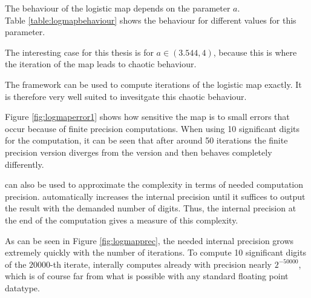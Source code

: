   The behaviour of the logistic map depends on the parameter $a$.\\
  Table \ref{table:logmapbehaviour} shows the behaviour for different values for this parameter.

  The interesting case for this thesis is for $a \in (3.544, 4)$, because this is  where the iteration of the map leads to chaotic behaviour.

  The \irram framework can be used to compute iterations of the logistic map exactly. It is therefore very well suited to invesitgate this chaotic behaviour.
  
  Figure \ref{fig:logmaperror1} shows how sensitive the map is to small errors that occur because of finite precision computations. 
  When using 10 significant digits for the computation, it can be seen that after around 50 iterations the finite precision version diverges from the \irram version and then behaves completely differently. 

  \irram can also be used to approximate the complexity in terms of needed computation precision. 
  \irram automatically increases the internal precision until it suffices to output the result with the demanded number of digits.
  Thus, the internal precision at the end of the computation gives a measure of this complexity. 

  As can be seen in Figure \ref{fig:logmapprec}, the needed internal precision grows extremely quickly with the number of iterations.
  To compute 10 significant digits of the $20000$-th iterate, \irram interally computes already with precision nearly $2^{-50000}$, which is of course far from what is possible with any standard floating point datatype.   
